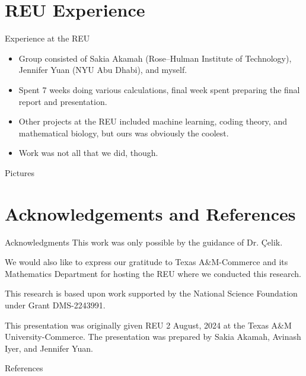 \documentclass{reu_beamer}
\begin{document}
\section{REU Experience}
\begin{frame}{Experience at the REU}
  \begin{itemize}
    \item Group consisted of Sakia Akamah (Rose--Hulman Institute of Technology), Jennifer Yuan (NYU Abu Dhabi), and myself.
    \item Spent 7 weeks doing various calculations, final week spent preparing the final report and presentation.
    \item Other projects at the REU included machine learning, coding theory, and mathematical biology, \pause but ours was obviously the coolest.\pause
    \item Work was not all that we did, though.
  \end{itemize}
\end{frame}
\begin{frame}{Pictures}

\end{frame}
\section{Acknowledgements and References}
    \begin{frame}{Acknowledgments}
    \centering
    This work was only possible by the guidance of Dr. \c{C}elik.\newline
    
    We would also like to express our gratitude to Texas A\&M-Commerce and its Mathematics Department for hosting the REU where we conducted this research.\newline
    
    This research is based upon work supported by the National Science Foundation under Grant DMS-2243991.\newline
    
    This presentation was originally given REU 2 August, 2024 at the Texas A\&M University-Commerce. The presentation was prepared by Sakia Akamah, Avinash Iyer, and Jennifer Yuan.
\end{frame}
%
\begin{frame}[allowframebreaks]{References}
\nocite{*}

{\small}
\end{frame}

\end{document}
